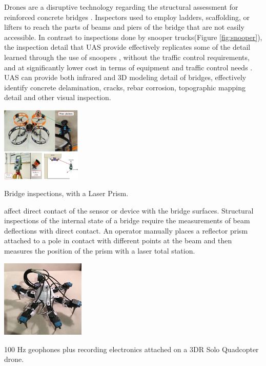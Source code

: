 Drones are a disruptive technology regarding the structural assessment for reinforced concrete bridges \cite{drone_vs_snooper_2016}. Inspectors used to employ ladders, scaffolding, or lifters to reach the parts of beams and piers of the bridge that are not easily accessible. In contrast to inspections done by snooper trucks(Figure \ref{fig:snooper}), the inspection detail that UAS provide effectively replicates some of the detail learned through the use of snoopers , without the traffic control requirements, and at significantly lower cost in terms of equipment and traffic control needs \cite{drone_vs_snooper_2016}. UAS can provide both infrared and 3D modeling detail of bridges, effectively identify concrete delamination, cracks, rebar corrosion, topographic mapping detail and other visual inspection. 
\begin{marginfigure}
    \includegraphics[width=3.8cm]{images/stage_sota/uav_prism.png}
    \caption{Bridge inspections, with a Laser Prism. \cite{feng_casero_gonzález_2019}}
\end{marginfigure}
\cite{feng_casero_gonzález_2019} \hspace*{0.3cm} \textit{}
\hspace*{0.5cm} affect direct contact of the sensor or device with the bridge surfaces. Structural inspections of the internal state of a bridge require the measurements of beam deflections with direct contact. An operator manually places a reflector prism attached to a pole in contact with different points at the beam and then measures the position of the prism with a laser total station. 

\begin{marginfigure}
    \includegraphics[width=4cm]{images/stage_sota/geophone_drone.png}
    \caption{100 Hz geophones plus recording electronics attached on a 3DR Solo Quadcopter drone.  \cite{stewart_chang_sudarchan_becker_huang_2016}}
\end{marginfigure}

